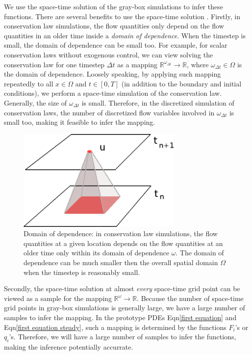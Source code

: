 \documentclass[a4paper,onecolumn]{article}
\theoremstyle{remark}
\begin{document}
\noindent We use the space-time solution of the gray-box simulations 
to infer these functions.
There are several benefits to use the space-time solution \cite{hanmaster}.
Firstly, in conservation law simulations, the flow quantities only depend on the flow
quantities in an older time inside a \emph{domain of dependence}.
When the timestep is small,
the domain of dependence can be small too. For example, for scalar conservation laws 
without exogenous control,
we can view solving the conservation law for one timestep $\Delta t$ as a mapping 
$\mathbb{R}^{\omega_{\Delta t}} \rightarrow \mathbb{R}$, where $\omega_{\Delta t}\in \Omega$ 
is the domain of dependence. 
Loosely speaking, by applying such mapping repeatedly to all $x\in \Omega$ and $t\in[0,T]$
(in addition to the boundary and initial conditions), we perform 
a space-time simulation of the conservation law. 
Generally, the size of $\omega_{\Delta t}$ is small.
Therefore, in the discretized simulation of conservation laws,
the number of discretized flow variables involved in $\omega_{\Delta t}$ is small too,
making it feasible to infer the mapping.
\\

\begin{figure}[H]\begin{center}
    \includegraphics[height=5cm]{locality.png}
    \caption{Domain of dependence: in conservation law simulations,
             the flow quantities at a given location
             depends on the flow quantities at an older time only within its
             domain of dependence $\omega$. The domain of dependence can be much smaller
             then the overall spatial domain $\Omega$ when the timestep is reasonably small.}
    \label{locality}
\end{center}\end{figure}

\noindent Secondly, the space-time solution at almost \emph{every} space-time grid point can be viewed
as a sample for the mapping $\mathbb{R}^\omega \rightarrow \mathbb{R}$. 
Because the number of space-time grid points in gray-box simulations is generally large,
we have a large number of samples to infer the mapping. 
In the prototype PDEs Eqn\eqref{first equation} and Eqn\eqref{first equation steady},
such a mapping is determined by the functions $F_i$'s or $q_i$'s.
Therefore, we will have a large number of samples to infer the functions,
making the inference potentially accurrate.\\
\end{document}
